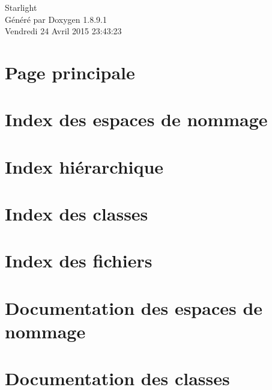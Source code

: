 \documentclass[twoside]{book}
\newcommand{\+}{\discretionary{\mbox{\scriptsize$\hookleftarrow$}}{}{}}
\newcommand{\clearemptydoublepage}{%
  \newpage{\pagestyle{empty}\cleardoublepage}%
}
\begin{document}
\hypersetup{pageanchor=false,
             bookmarks=true,
             bookmarksnumbered=true,
             pdfencoding=unicode
            }
\begin{titlepage}
\vspace*{7cm}
\begin{center}%
{\Large Starlight }\\
\vspace*{1cm}
{\large Généré par Doxygen 1.8.9.1}\\
\vspace*{0.5cm}
{\small Vendredi 24 Avril 2015 23:43:23}\\
\end{center}
\end{titlepage}
\clearemptydoublepage
\tableofcontents
\clearemptydoublepage
{}
\hypersetup{pageanchor=true}

\chapter{Page principale}
\label{index}\hypertarget{index}{}
\chapter{Index des espaces de nommage}

\chapter{Index hiérarchique}

\chapter{Index des classes}

\chapter{Index des fichiers}

\chapter{Documentation des espaces de nommage}



\chapter{Documentation des classes}




















\end{document}
